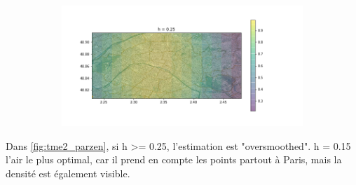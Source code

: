 \documentclass[a4paper,12pt]{article}
\begin{document}
\begin{figure}[h!]
\begin{subfigure}{.24\textwidth}
\end{subfigure}
\begin{subfigure}{.24\textwidth}
  \centering
	\includegraphics[width=\linewidth]{images/tme2/atms_parzen_3.png}
\end{subfigure}
\end{figure}

Dans \autoref{fig:tme2_parzen}, si h >= 0.25, l'estimation est "oversmoothed".
h = 0.15 l'air le plus optimal, car il prend en compte les points partout à Paris, mais la densité est également visible.
\end{document}
